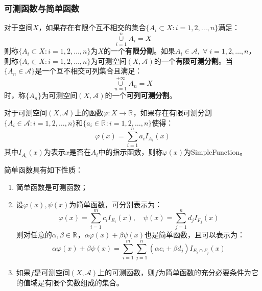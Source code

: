 \subsubsection{可测函数与简单函数}
\begin{definition}
	对于空间$X$，如果存在有限个互不相交的集合$\{A_i\subset X:i=1,2,\dots,n\}$满足：
	\begin{equation*}
		\underset{i=1}{\overset{n}{\cup}}A_i=X
	\end{equation*}
	则称$\{A_i\subset X:i=1,2,\dots,n\}$为$X$的一个\textbf{有限分割}。如果$A_i\in \mathscr{A},\;\forall\;i=1,2,\dots,n$，则称$\{A_i\subset X:i=1,2,\dots,n\}$为可测空间$(X,\mathscr{A})$的一个\textbf{有限可测分割}。当$\{A_n\in\mathscr{A}\}$是一个互不相交可列集合且满足：
	\begin{equation*}
		\underset{n=1}{\overset{+\infty}{\cup}}A_n=X
	\end{equation*}
	时，称$\{A_n\}$为可测空间$(X,\mathcal{A})$的一个\textbf{可列可测分割}。
\end{definition}
\begin{definition}
	对于可测空间$(X,\mathscr{A})$上的函数$\varphi:X\rightarrow \mathbb{R}^{}$，如果存在有限可测分割$\{A_i\in \mathscr{A}:i=1,2,\dots,n\}$和$\{a_i\in\mathbb{R}^{}:i=1,2,\dots,n\}$使得：
	\begin{equation*}
		\varphi(x)=\sum_{i=1}^{n}a_iI_{A_i}(x)
	\end{equation*}
	其中$I_{A_i}(x)$为表示$x$是否在$A_i$中的指示函数，则称$\varphi(x)$为\gls{SimpleFunction}。
\end{definition}
\begin{property}\label{prop:SimpleFunction}
	简单函数具有如下性质：
	\begin{enumerate}
		\item 简单函数是可测函数；
		\item 设$\varphi(x),\psi(x)$为简单函数，可分别表示为：
		\begin{equation*}
			\varphi(x)=\sum_{i=1}^{m}c_iI_{E_i}(x),\quad
			\psi(x)=\sum_{j=1}^{n}d_jI_{F_j}(x)
		\end{equation*}
		则对任意的$\alpha,\beta\in\mathbb{R}^{}$，$\alpha\varphi(x)+\beta\psi(x)$也是简单函数，且可以表示为：
		\begin{equation*}
		\alpha\varphi(x)+\beta\psi(x)=\sum_{i=1}^{m}\sum_{j=1}^{n}(\alpha c_i+\beta d_j)I_{E_i\cap F_j}(x)
		\end{equation*}
		\item 如果$f$是可测空间$(X,\mathscr{A})$上的可测函数，则$f$为简单函数的充分必要条件为它的值域是有限个实数组成的集合。
	\end{enumerate}
\end{property}
